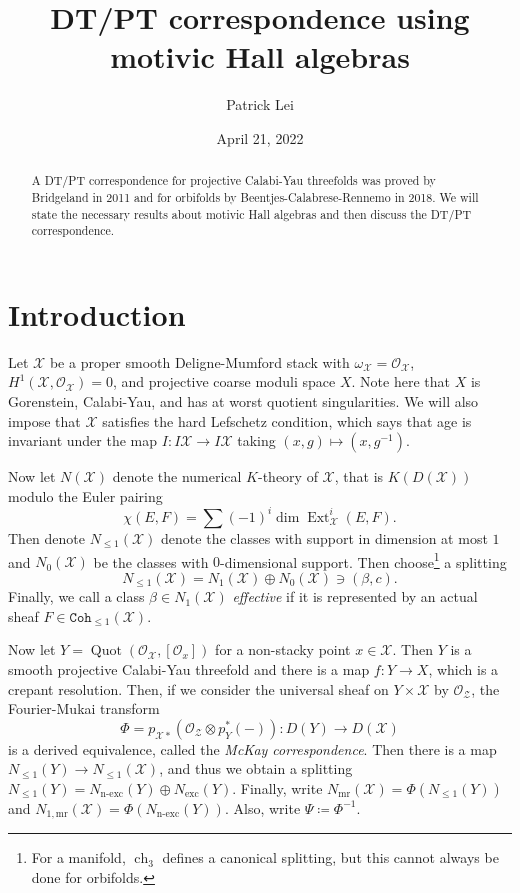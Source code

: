 \documentclass{amsart}
\title{DT/PT correspondence using motivic Hall algebras}
\author{Patrick Lei}
\date{April 21, 2022}
\theoremstyle{definition}
\theoremstyle{remark}
\theoremstyle{plain}
\theoremstyle{definition}
\theoremstyle{remark}
\newcommand{\mc}[1]{\mathcal{#1}}
\newcommand{\mr}[1]{\mathrm{#1}}
\newcommand{\on}[1]{\operatorname{#1}}
\newcommand{\mt}[1]{\mathtt{#1}}
\newcommand{\1}{\mathbf{1}}
\newcommand{\2}{\mathbf{2}}
\newcommand{\3}{\mathbf{3}}
\DeclareMathOperator{\Ext}{Ext}
\begin{document}
    
\maketitle

\begin{abstract}
    A DT/PT correspondence for projective Calabi-Yau threefolds was proved by Bridgeland in 2011 and for orbifolds by Beentjes-Calabrese-Rennemo in 2018. We will state the necessary results about motivic Hall algebras and then discuss the DT/PT correspondence.
\end{abstract}

\section{Introduction}

Let $\mc{X}$ be a proper smooth Deligne-Mumford stack with $\omega_{\mc{X}} = \mc{O}_{\mc{X}}$, $H^1(\mc{X}, \mc{O}_{\mc{X}}) = 0$, and projective coarse moduli space $X$. Note here that $X$ is Gorenstein, Calabi-Yau, and has at worst quotient singularities. We will also impose that $\mc{X}$ satisfies the hard Lefschetz condition, which says that age is invariant under the map $I \colon I \mc{X} \to I \mc{X}$ taking $(x, g) \mapsto (x, g^{-1})$.

Now let $N(\mc{X})$ denote the numerical $K$-theory of $\mc{X}$, that is $K(D(\mc{X}))$ modulo the Euler pairing
\[ \chi(E, F) = \sum (-1)^i \dim \Ext^i_{\mc{X}}(E, F). \]
Then denote $N_{\leq 1}(\mc{X})$ denote the classes with support in dimension at most $1$ and $N_0(\mc{X})$ be the classes with $0$-dimensional support. Then choose\footnote{For a manifold, $\on{ch}_3$ defines a canonical splitting, but this cannot always be done for orbifolds.} a splitting
\[ N_{\leq 1}(\mc{X}) = N_1(\mc{X}) \oplus N_0(\mc{X}) \ni (\beta, c). \]
Finally, we call a class $\beta \in N_1(\mc{X})$ \textit{effective} if it is represented by an actual sheaf $F \in \mt{Coh}_{\leq 1}(\mc{X})$.

Now let $Y = \on{Quot}(\mc{O}_{\mc{X}}, [\mc{O}_x])$ for a non-stacky point $x \in \mc{X}$. Then $Y$ is a smooth projective Calabi-Yau threefold and there is a map $f \colon Y \to X$, which is a crepant resolution. Then, if we consider the universal sheaf on $Y \times \mc{X}$ by $\mc{O}_{\mc{Z}}$, the Fourier-Mukai transform
\[ \Phi = p_{\mc{X}*} (\mc{O}_{\mc{Z}} \otimes p_Y^*(-)) \colon D(Y) \to D(\mc{X}) \]
is a derived equivalence, called the \textit{McKay correspondence}. Then there is a map $N_{\leq 1}(Y) \to N_{\leq 1}(\mc{X})$, and thus we obtain a splitting $N_{\leq 1}(Y) = N_{\text{n-exc}}(Y) \oplus N_{\mr{exc}}(Y)$. Finally, write $N_{\mr{mr}}(\mc{X}) = \Phi(N_{\leq 1}(Y))$ and $N_{1,\mr{mr}}(\mc{X}) = \Phi(N_{\text{n-exc}}(Y))$. Also, write $\Psi \coloneqq \Phi^{-1}$.
\end{document}
